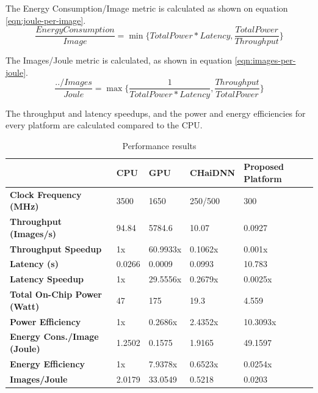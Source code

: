The Energy Consumption/Image metric is calculated as shown on equation \ref{eqn:joule-per-image}.
\begin{equation}
	\label{eqn:joule-per-image}
	\frac{Energy Consumption}{Image} = \min \{TotalPower * Latency, \frac{TotalPower}{Throughput}\}
\end{equation}

The Images/Joule metric is calculated, as shown in equation \ref{eqn:images-per-joule}.
\begin{equation}
	\label{eqn:images-per-joule}
	\frac{../Images}{Joule} = \max \{\frac{1}{TotalPower * Latency}, \frac{Throughput}{TotalPower}\}
\end{equation}

The throughput and latency speedups, and the power and energy efficiencies for every platform are calculated compared to the CPU.

\begin{table}[H]
	\caption{Performance results}
	\label{tab:Performance-results}
	\centering
	\begin{tabular}{l|l|l|l|p{2cm}}
		\toprule
		                                    & \textbf{CPU} & \textbf{GPU} & \textbf{CHaiDNN} & \textbf{Proposed Platform} \\
		\midrule
		\textbf{Clock Frequency (MHz)}      & 3500         & 1650         & 250/500          & 300                        \\
		\textbf{Throughput (Images/s)}      & 94.84        & 5784.6       & 10.07            & 0.0927                     \\
		\textbf{Throughput Speedup}         & 1x           & 60.9933x     & 0.1062x          & 0.001x                     \\
		\textbf{Latency (s)}                & 0.0266       & 0.0009       & 0.0993           & 10.783                     \\
		\textbf{Latency Speedup}            & 1x           & 29.5556x     & 0.2679x          & 0.0025x                    \\
		\textbf{Total On-Chip Power (Watt)} & 47           & 175          & 19.3             & 4.559                      \\
		\textbf{Power Efficiency}           & 1x           & 0.2686x      & 2.4352x          & 10.3093x                   \\
		\textbf{Energy Cons./Image (Joule)} & 1.2502       & 0.1575       & 1.9165           & 49.1597                    \\
		\textbf{Energy Efficiency}          & 1x           & 7.9378x      & 0.6523x          & 0.0254x                    \\
		\textbf{Images/Joule}               & 2.0179       & 33.0549      & 0.5218           & 0.0203                     \\
		\bottomrule
	\end{tabular}
\end{table}


